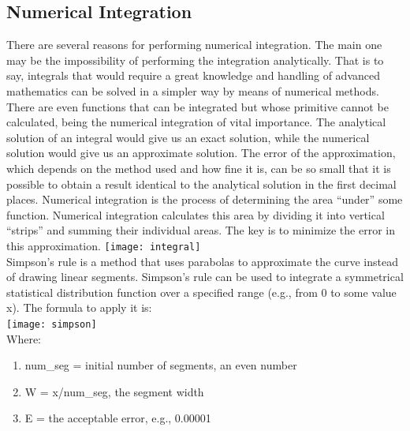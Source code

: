 \documentclass{article}
\begin{document}
\subsection{Numerical Integration}
{There are several reasons for performing numerical integration. The main one may be the impossibility of performing the integration analytically. That is to say, integrals that would require a great knowledge and handling of advanced mathematics can be solved in a simpler way by means of numerical methods. There are even functions that can be integrated but whose primitive cannot be calculated, being the numerical integration of vital importance. The analytical solution of an integral would give us an exact solution, while the numerical solution would give us an approximate solution. The error of the approximation, which depends on the method used and how fine it is, can be so small that it is possible to obtain a result identical to the analytical solution in the first decimal places.}
{Numerical integration is the process of determining the area “under” some function. Numerical integration calculates this area by dividing it into vertical “strips” and summing their individual areas. The key is to minimize the error in this approximation.}
\texttt{[image: integral]}
{\\Simpson's rule is a method that uses parabolas to approximate the curve instead of drawing linear segments.}
{Simpson's rule can be used to integrate a symmetrical statistical distribution function over a specified range (e.g., from 0 to some value x).} 
{The formula to apply it is: \\}
\texttt{[image: simpson]}
{\\Where:}
\begin{enumerate}
\item num\_seg = initial number of segments, an even number
\item W = x/num\_seg, the segment width
\item E = the acceptable error, e.g., 0.00001
\end{enumerate}
\end{document}
